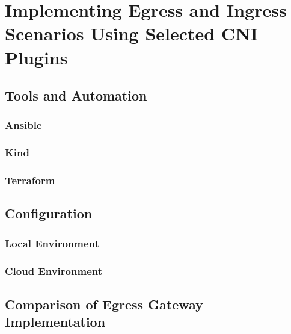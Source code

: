 \chapter{Implementing Egress and Ingress Scenarios Using Selected CNI Plugins}
\label{cha:practical_impl}



\section{Tools and Automation}
\label{sec:tools}

\subsection{Ansible}
\label{sec:ansible}

\subsection{Kind}
\label{sec:kind}

\subsection{Terraform}
\label{sec:terraform}

\section{Configuration}
\label{sec:conf}

\subsection{Local Environment}
\label{sec:local_conf}

\subsection{Cloud Environment}
\label{sec:cloud_conf}


\section{Comparison of Egress Gateway Implementation}
\label{sec:compare_egress_impl}

